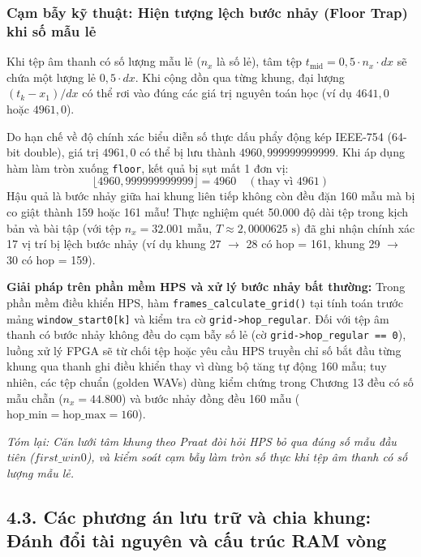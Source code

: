 \subsubsection*{Cạm bẫy kỹ thuật: Hiện tượng lệch bước nhảy (Floor Trap) khi số mẫu lẻ}
Khi tệp âm thanh có số lượng mẫu lẻ ($n_x$ là số lẻ), tâm tệp $t_{\text{mid}} = 0{,}5 \cdot n_x \cdot dx$ sẽ chứa một lượng lẻ $0{,}5 \cdot dx$. Khi cộng dồn qua từng khung, đại lượng $(t_k - x_1)/dx$ có thể rơi vào đúng các giá trị nguyên toán học (ví dụ $4641{,}0$ hoặc $4961{,}0$).

Do hạn chế về độ chính xác biểu diễn số thực dấu phẩy động kép IEEE-754 (64-bit double), giá trị $4961{,}0$ có thể bị lưu thành $4960{,}999999999999$. Khi áp dụng hàm làm tròn xuống \texttt{floor}, kết quả bị sụt mất 1 đơn vị:
\begin{equation}
\lfloor 4960{,}999999999999 \rfloor = 4960 \quad (\text{thay vì } 4961)
\end{equation}
Hậu quả là bước nhảy giữa hai khung liên tiếp không còn đều đặn 160 mẫu mà bị co giật thành 159 hoặc 161 mẫu!
Thực nghiệm quét 50.000 độ dài tệp trong kịch bản  và bài tập  (với tệp $n_x = 32.001$ mẫu, $T \approx 2{,}0000625\text{ s}$) đã ghi nhận chính xác 17 vị trí bị lệch bước nhảy (ví dụ khung 27 $\to$ 28 có hop = 161, khung 29 $\to$ 30 có hop = 159).

\textbf{Giải pháp trên phần mềm HPS và xử lý bước nhảy bất thường:}
Trong phần mềm điều khiển HPS, hàm \texttt{frames\_calculate\_grid()} tại  tính toán trước mảng \texttt{window\_start0[k]} và kiểm tra cờ \texttt{grid->hop\_regular}.
Đối với tệp âm thanh có bước nhảy không đều do cạm bẫy số lẻ (cờ \texttt{grid->hop\_regular == 0}), luồng xử lý FPGA sẽ từ chối tệp hoặc yêu cầu HPS truyền chỉ số bắt đầu từng khung qua thanh ghi điều khiển thay vì dùng bộ tăng tự động 160 mẫu; tuy nhiên, các tệp chuẩn (golden WAVs) dùng kiểm chứng trong Chương 13 đều có số mẫu chẵn ($n_x = 44.800$) và bước nhảy đồng đều 160 mẫu ($\text{hop\_min} = \text{hop\_max} = 160$).

\textit{Tóm lại: Căn lưới tâm khung theo Praat đòi hỏi HPS bỏ qua đúng số mẫu đầu tiên ($first\_win0$), và kiểm soát cạm bẫy làm tròn số thực khi tệp âm thanh có số lượng mẫu lẻ.}

\subsection*{4.3. Các phương án lưu trữ và chia khung: Đánh đổi tài nguyên và cấu trúc RAM vòng}

